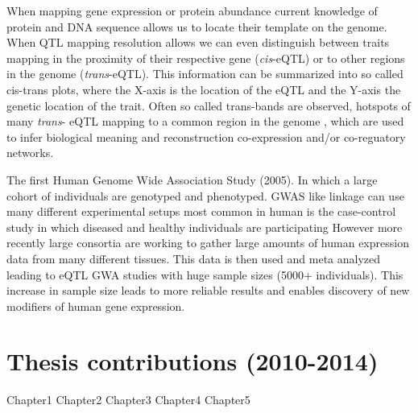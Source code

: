 When mapping gene expression or protein abundance current knowledge of protein and DNA sequence 
allows us to locate their template on the genome. When QTL mapping resolution allows we can even 
distinguish between traits mapping in the proximity of their respective gene (\emph{cis}-eQTL) 
or to other regions in the genome (\emph{trans}-eQTL). This information can be summarized into 
so called cis-trans plots, where the X-axis is the location of the eQTL and the Y-axis the genetic 
location of the trait. Often so called trans-bands are observed, hotspots of many \emph{trans}-
eQTL mapping to a common region in the genome \cite{Breitling:2008a}, which are used to infer 
biological meaning and reconstruction co-expression and/or co-reguatory networks.

The first Human Genome Wide Association Study (2005). In which a large cohort of individuals 
are genotyped and phenotyped. GWAS like linkage can use many different experimental setups 
most common in human is the case-control study in which diseased and healthy individuals are 
participating  However more recently large consortia are working to gather large amounts of 
human expression data from many different tissues. This data is then used and meta analyzed 
leading to eQTL GWA studies with huge sample sizes (5000+ individuals). This increase in 
sample size leads to more reliable results and enables discovery of new modifiers of human 
gene expression.

\section{Thesis contributions (2010-2014)}
Chapter1
Chapter2
Chapter3
Chapter4
Chapter5

